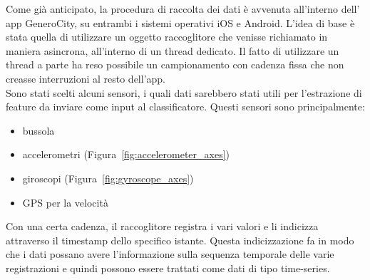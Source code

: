 Come già anticipato, la procedura di raccolta dei dati è avvenuta all'interno dell'
app GeneroCity, su entrambi i sistemi operativi iOS e Android. L'idea di base è stata
quella di utilizzare un oggetto raccoglitore che venisse richiamato in maniera
asincrona, all'interno di un thread dedicato. Il fatto di utilizzare un thread a parte
ha reso possibile un campionamento con cadenza fissa che non creasse interruzioni al
resto dell'app.\\
Sono stati scelti alcuni sensori, i quali dati sarebbero stati utili per l'estrazione
di feature da inviare come input al classificatore. Questi sensori sono principalmente:
\begin{itemize}
    \item bussola
    \item accelerometri \cite{activity_recognition_accelerometer}
    (Figura~\ref{fig:accelerometer_axes})
    \item giroscopi
    (Figura~\ref{fig:gyroscope_axes})
    \item GPS per la velocità
\end{itemize}
Con una certa cadenza, il raccoglitore registra i vari valori e li indicizza
attraverso il timestamp dello specifico istante. Questa indicizzazione fa in modo
che i dati possano avere l'informazione sulla sequenza temporale delle varie
registrazioni e quindi possono essere trattati come dati di tipo time-series.

